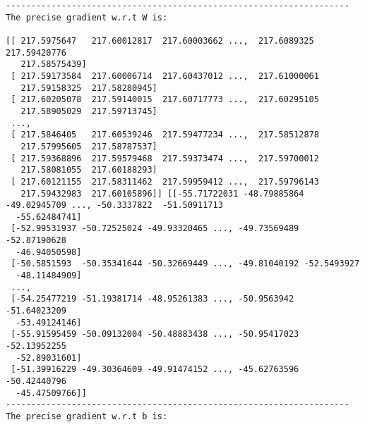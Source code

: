 \documentclass{article}
\begin{document}
\begin{lstlisting}
--------------------------------------------------------------------
The precise gradient w.r.t W is:

[[ 217.5975647   217.60012817  217.60003662 ...,  217.6089325   217.59420776
   217.58575439]
 [ 217.59173584  217.60006714  217.60437012 ...,  217.61000061
   217.59158325  217.58280945]
 [ 217.60205078  217.59140015  217.60717773 ...,  217.60295105
   217.58905029  217.59713745]
 ..., 
 [ 217.5846405   217.60539246  217.59477234 ...,  217.58512878
   217.57995605  217.58787537]
 [ 217.59368896  217.59579468  217.59373474 ...,  217.59700012
   217.58081055  217.60188293]
 [ 217.60121155  217.58311462  217.59959412 ...,  217.59796143
   217.59432983  217.60105896]] [[-55.71722031 -48.79885864 -49.02945709 ..., -50.3337822  -51.50911713
  -55.62484741]
 [-52.99531937 -50.72525024 -49.93320465 ..., -49.73569489 -52.87190628
  -46.94050598]
 [-50.5851593  -50.35341644 -50.32669449 ..., -49.81040192 -52.5493927
  -48.11484909]
 ..., 
 [-54.25477219 -51.19381714 -48.95261383 ..., -50.9563942  -51.64023209
  -53.49124146]
 [-55.91595459 -50.09132004 -50.48883438 ..., -50.95417023 -52.13952255
  -52.89031601]
 [-51.39916229 -49.30364609 -49.91474152 ..., -45.62763596 -50.42440796
  -45.47509766]]
--------------------------------------------------------------------
The precise gradient w.r.t b is:


\end{lstlisting}
\end{document}
